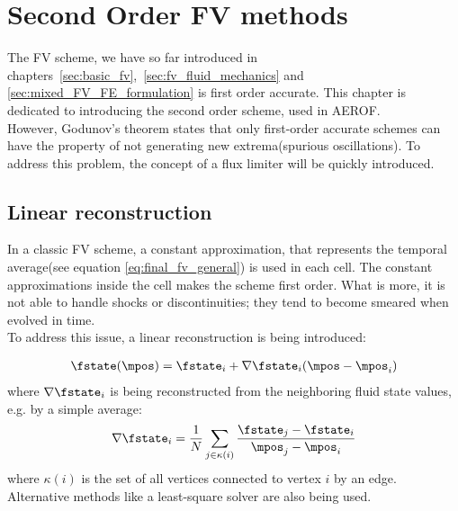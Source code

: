 \documentclass[../main.tex]{subfiles}
\begin{document}
\section{Second Order \ac{FV} methods}\label{sec:fv_ordertwo}

The \ac{FV} scheme, we have so far introduced in chapters~\ref{sec:basic_fv},~\ref{sec:fv_fluid_mechanics} and \ref{sec:mixed_FV_FE_formulation} is first order accurate. This chapter is dedicated to introducing the second order scheme, used in AEROF.\\
However, Godunov's theorem \cite{Godunov1959} states that only first-order accurate schemes can have the property of not generating new extrema(spurious oscillations)\cite{Godunov1959}. To address this problem, the concept of a flux limiter will be quickly introduced.



\subsection{Linear reconstruction}\label{sec:linear_reconstruction}
In a classic FV scheme, a constant approximation, that represents the temporal average(see equation \eqref{eq:final_fv_general}) is used in each cell. The constant approximations inside the cell makes the scheme first order. What is more, it is not able to handle shocks or discontinuities; they tend to become smeared when evolved in time.\\
To address this issue, a linear reconstruction is being introduced:

\begin{align}\label{eq:linear_reconstruction}
\fstate(\mpos)=\fstate_i+\nabla\fstate_i (\mpos-\mpos_i)
\end{align}
where $\nabla\fstate_i$ is being reconstructed from the neighboring fluid state values, e.g. by a simple average:
\begin{align}\label{eq:gradient_average}
\nabla\fstate_i=\frac{1}{N} \sum_{j\in\kappa(i)} \frac{\fstate_j-\fstate_i}{\mpos_j-\mpos_i}
\end{align}
where $\kappa(i)$ is the set of all vertices connected to vertex $i$ by an edge. Alternative methods like a least-square solver are also being used.\\
\end{document}
